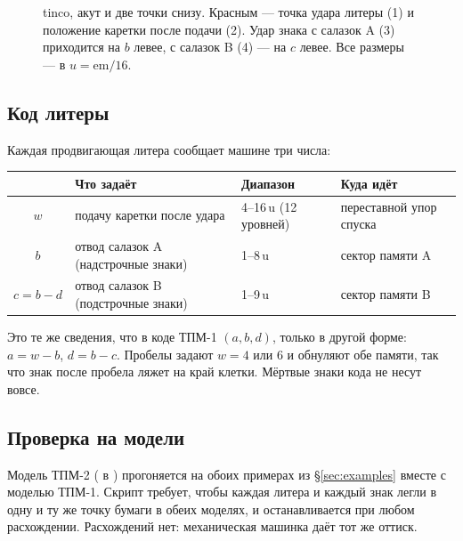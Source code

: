 \begin{figure}[h]
\centering
\setlength\tgem{34mm}
\begin{tikzpicture}[x=\tgu,y=\tgu]

\end{tikzpicture}
\caption{tinco, акут и две точки снизу. Красным — точка удара литеры (1) и положение каретки после подачи (2). Удар знака с салазок A (3) приходится на $b$ левее, с салазок B (4) — на $c$ левее. Все размеры — в $u = \mathrm{em}/16$.}
\label{fig:geom}
\end{figure}

\subsection{Код литеры}

Каждая продвигающая литера сообщает машине три числа:

\begin{center}\small
\begin{tabular}{@{}clll@{}}
\toprule
& Что задаёт & Диапазон & Куда идёт \\
\midrule
$w$ & подачу каретки после удара & 4--16\,u (12 уровней) & переставной упор спуска \\
$b$ & отвод салазок A (надстрочные знаки) & 1--8\,u & сектор памяти A \\
$c = b - d$ & отвод салазок B (подстрочные знаки) & 1--9\,u & сектор памяти B \\
\bottomrule
\end{tabular}
\end{center}

Это те же сведения, что в коде ТПМ-1 $(a, b, d)$, только в другой форме: $a = w - b$, $d = b - c$. Пробелы задают $w = 4$ или $6$ и обнуляют обе памяти, так что знак после пробела ляжет на край клетки. Мёртвые знаки кода не несут вовсе.

\subsection{Проверка на модели}

Модель ТПМ-2 ( в ) прогоняется на обоих примерах из \S\ref{sec:examples} вместе с моделью ТПМ-1. Скрипт требует, чтобы каждая литера и каждый знак легли в одну и ту же точку бумаги в обеих моделях, и останавливается при любом расхождении. Расхождений нет: механическая машинка даёт тот же оттиск.

